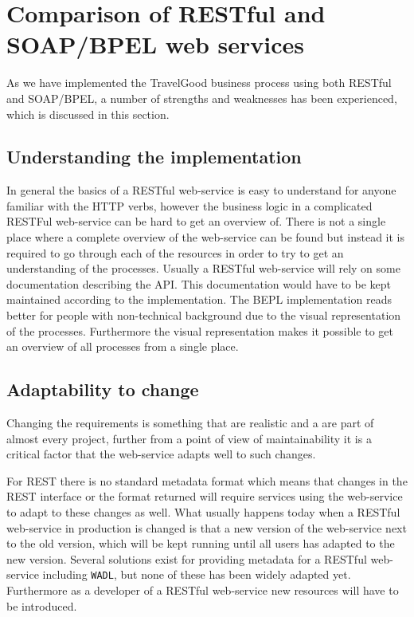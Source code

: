 {\setlength{\chapterfontsize}{26pt}
\chapter{Comparison of RESTful and SOAP/BPEL web services}
}

As we have implemented the TravelGood business process using both RESTful and SOAP/BPEL, a number of strengths and weaknesses has been experienced, which is discussed in this section. 


\section{Understanding the implementation}
In general the basics of a RESTful web-service is easy to understand for anyone familiar with the HTTP verbs, however the business logic in a complicated RESTFul web-service can be hard to get an overview of. There is not a single place where a complete overview of the web-service can be found but instead it is required to go through each of the resources in order to try to get an understanding of the processes. Usually a RESTful web-service will rely on some documentation describing the API. This documentation would have to be kept maintained according to the implementation. The BEPL implementation reads better for people with non-technical background due to the visual representation of the processes. Furthermore the visual representation makes it possible to get an overview of all processes from a single place.

\section{Adaptability to change}
Changing the requirements is something that are realistic and a are part of almost every project, further from a point of view of maintainability it is a critical factor that the web-service adapts well to such changes.

For REST there is no standard metadata format which means that changes in the REST interface or the format returned will require services using the web-service to adapt to these changes as well. What usually happens today when a RESTful web-service in production is changed is that a new version of the web-service next to the old version, which will be kept running until all users has adapted to the new version. Several solutions exist for providing metadata for a RESTful web-service including \texttt{WADL}, but none of these has been widely adapted yet. Furthermore as a developer of a RESTful web-service new resources will have to be introduced.

